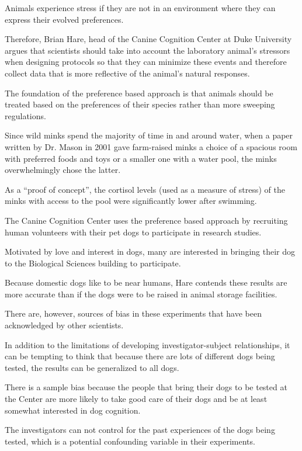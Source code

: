 \begin{inparaenum}[\bfseries 1]
\indent \item Animals experience stress if they are not in an environment where they can express their evolved preferences. \item Therefore, Brian Hare, head of the Canine Cognition Center at Duke University argues that scientists should take into account the laboratory animal's stressors when designing protocols so that they can minimize these events and therefore collect data that is more reflective of the animal's natural responses. \item The foundation of the preference based approach is that animals should be treated based on the preferences of their species rather than more sweeping regulations. \item Since wild minks spend the majority of time in and around water, when a paper written by Dr. Mason in 2001 gave farm-raised minks a choice of a spacious room with preferred foods and toys or a smaller one with a water pool, the minks overwhelmingly chose the latter. \item As a ``proof of concept'', the cortisol levels (used as a measure of stress) of the minks with access to the pool were significantly lower after swimming.

\indent \item The Canine Cognition Center uses the preference based approach by recruiting human volunteers with their pet dogs to participate in research studies. \item Motivated by love and interest in dogs, many are interested in bringing their dog to the Biological Sciences building to participate. \item Because domestic dogs like to be near humans, Hare contends these results are more accurate than if the dogs were to be raised in animal storage facilities. 

\indent \item There are, however, sources of bias in these experiments that have been acknowledged by other scientists. \item In addition to the limitations of developing investigator-subject relationships, it can be tempting to think that because there are lots of different dogs being tested, the results can be generalized to all dogs. \item There is a sample bias because the people that bring their dogs to be tested at the Center are more likely to take good care of their dogs and be at least somewhat interested in dog cognition. \item The investigators can not control for the past experiences of the dogs being tested, which is a potential confounding variable in their experiments.
\end{inparaenum}

